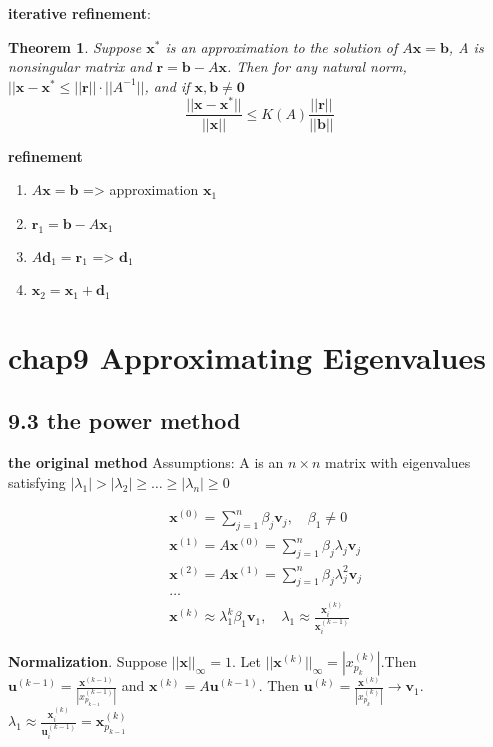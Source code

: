 \documentclass[11pt]{article}
\newtheorem{theorem}{Theorem}[section]
\newcommand{\bl}[1] {\boldsymbol{#1}}
\begin{document}
\textbf{iterative refinement}:
\begin{theorem}
Suppose $\bl{x}^*$ is an approximation to the solution of $A\bl{x}=\bl{b}$, A is
nonsingular matrix and $\bl{r}=\bl{b}-A\bl{x}$. Then for any natural norm,
$||\bl{x-x^*}\le||\bl{r}||\cdot||A^{-1}||$, and if $\bl{x,b}\neq\bl{0}$
\begin{equation*}
\frac{||\bl{x}-\bl{x}^*||}{||\bl{x}||}\le K(A)\frac{||\bl{r}||}{||\bl{b}||}
\end{equation*}
\end{theorem}

\textbf{refinement}
\begin{enumerate}
\item \(A\bl{x}=\bl{b}\) => approximation \(\bl{x}_1\)
\item \(\bl{r}_1=\bl{b}-A\bl{x}_1\)
\item \(A\bl{d}_1=\bl{r}_1\) => \(\bl{d}_1\)
\item \(\bl{x}_2=\bl{x}_1+\bl{d}_1\)
\end{enumerate}
\section{chap9 Approximating Eigenvalues}
\label{sec:org5fed992}
\subsection{9.3 the power method}
\label{sec:org304eb40}
\textbf{the original method}
Assumptions: A is an \(n\times n\) matrix with eigenvalues satisfying
\(|\lambda_1|>|\lambda_2|\ge\dots\ge|\lambda_n|\ge 0\)

\begin{align*}
&\bl{x}^{(0)}=\displaystyle\sum_{j=1}^{n}\beta_j\bl{v}_j,\quad\beta_1\neq 0\\
&\bl{x}^{(1)}=A\bl{x}^{(0)}=\displaystyle\sum_{j=1}^n\beta_j\lambda_j\bl{v}_j\\
&\bl{x}^{(2)}=A\bl{x}^{(1)}=\displaystyle\sum_{j=1}^n\beta_j\lambda_j^2\bl{v}_j\\
&\dots\\
&\bl{x}^{(k)}\approx\lambda_1^k\beta_1\bl{v}_1, \quad \lambda_1\approx
\frac{\bl{x}^{(k)}_i}{\bl{x}^{(k-1)}_i}
\end{align*}

\textbf{Normalization}. Suppose \(||\bl{x}||_\infty=1\). Let
\(||\bl{x}^{(k)}||_\infty=|x_{p_k}^{(k)}|\).Then \(\bl{u}^{(k-1)}=
   \frac{\bl{x}^{(k-1)}}{|x_{p_{k-1}}^{(k-1)}|}\) and
\(\bl{x}^{(k)}=A\bl{u}^{(k-1)}\).
Then \(\bl{u}^{(k)}= \frac{\bl{x}^{(k)}}{|x_{p_k}^{(k)}|}\to \bl{v}_1\).
\(\lambda_1\approx
   \frac{\bl{x}_i^{(k)}}{\bl{u}_i^{(k-1)}}=\bl{x}_{p_{k-1}}^{(k)}\)
\end{document}
